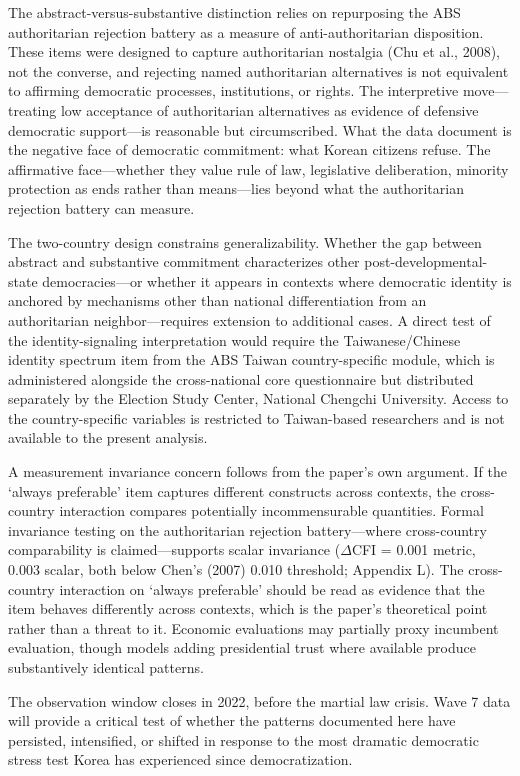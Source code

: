 \documentclass[
  12pt,
  12pt,
  letterpaper]{article}
\begin{document}
The abstract-versus-substantive distinction relies on repurposing the
ABS authoritarian rejection battery as a measure of anti-authoritarian
disposition. These items were designed to capture authoritarian
nostalgia (Chu et al., 2008), not the converse, and rejecting named
authoritarian alternatives is not equivalent to affirming democratic
processes, institutions, or rights. The interpretive move---treating low
acceptance of authoritarian alternatives as evidence of defensive
democratic support---is reasonable but circumscribed. What the data
document is the negative face of democratic commitment: what Korean
citizens refuse. The affirmative face---whether they value rule of law,
legislative deliberation, minority protection as ends rather than
means---lies beyond what the authoritarian rejection battery can
measure.

The two-country design constrains generalizability. Whether the gap
between abstract and substantive commitment characterizes other
post-developmental-state democracies---or whether it appears in contexts
where democratic identity is anchored by mechanisms other than national
differentiation from an authoritarian neighbor---requires extension to
additional cases. A direct test of the identity-signaling interpretation
would require the Taiwanese/Chinese identity spectrum item from the ABS
Taiwan country-specific module, which is administered alongside the
cross-national core questionnaire but distributed separately by the
Election Study Center, National Chengchi University. Access to the
country-specific variables is restricted to Taiwan-based researchers and
is not available to the present analysis.

A measurement invariance concern follows from the paper's own argument.
If the `always preferable' item captures different constructs across
contexts, the cross-country interaction compares potentially
incommensurable quantities. Formal invariance testing on the
authoritarian rejection battery---where cross-country comparability is
claimed---supports scalar invariance (\(\Delta\)CFI = 0.001 metric,
0.003 scalar, both below Chen's (2007) 0.010 threshold; Appendix L). The
cross-country interaction on `always preferable' should be read as
evidence that the item behaves differently across contexts, which is the
paper's theoretical point rather than a threat to it. Economic
evaluations may partially proxy incumbent evaluation, though models
adding presidential trust where available produce substantively
identical patterns.

The observation window closes in 2022, before the martial law crisis.
Wave 7 data will provide a critical test of whether the patterns
documented here have persisted, intensified, or shifted in response to
the most dramatic democratic stress test Korea has experienced since
democratization.
\end{document}
